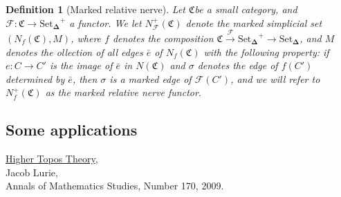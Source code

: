 \documentclass[12pt]{amsart}
\newcommand{\8}{\ensuremath{\infty}}
\newcommand{\C}{\ensuremath{\mathfrak{C}}}
\newcommand{\SSet}{\ensuremath{\text{Set}_{\boldsymbol{\Delta}}}}
\newtheorem{definition}{Definition}
\begin{document}
\begin{definition}[Marked relative nerve]
  Let \C be a small category, and $\mathcal{F}: \C \rightarrow \SSet^+$ a functor. We let $N_\mathcal{F}^+(\C)$ denote the marked simplicial set $(N_f(\C), M)$, where $f$ denotes the composition $\C \overset{\mathcal{F}}{\rightarrow} \SSet^+ \rightarrow \SSet$, and $M$ denotes the ollection of all edges $\bar{e}$ of $N_f(\C)$ with the following property: if $e: C \rightarrow C'$ is the image of $\bar{e}$ in $N(\C)$ and $\sigma$ denotes the edge of $f(C')$ determined by $\bar{e}$, then $\sigma$ is a marked edge of $\mathcal{F}(C')$, and we will refer to $N_f^+(\C)$ as the marked relative nerve functor.
\end{definition}

\subsection{Some applications}


\begin{thebibliography}{99}
  \href{https: //arxiv.org/abs/math/0608040}{Higher Topos Theory}, \\
  Jacob Lurie, \\
  Annals of Mathematics Studies, Number 170, 2009.
\end{thebibliography}
\end{document}
